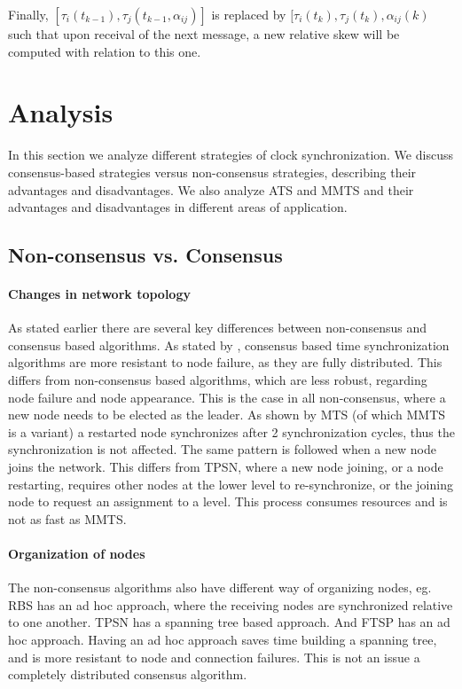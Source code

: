\documentclass[a4paper,12pt]{article}
\begin{document}
    Finally, $[\tau_i(t_{k-1}), \tau_j(t_{k-1},\alpha_{ij})]$ is replaced by $[\tau_i(t_k), \tau_j(t_k),\alpha_{ij}(k)$ such that upon receival of the next message, a new relative skew will be computed with relation to this one.
    
    
\clearpage

\section{Analysis}

In this section we analyze different strategies of clock synchronization. We discuss consensus-based strategies versus non-consensus strategies, describing their advantages and disadvantages. We also analyze ATS and MMTS and their advantages and disadvantages in different areas of application.

\subsection{Non-consensus vs. Consensus}

\paragraph{Changes in network topology} As stated earlier there are several key differences between non-consensus and consensus based algorithms. As stated by \cite{SchenatoGamba07}, consensus based time synchronization algorithms are more resistant to node failure, as they are fully distributed. This differs from non-consensus based algorithms, which are less robust, regarding node failure and node appearance. This is the case in all non-consensus, where a new node needs to be elected as the leader. As shown by \citet{HeLiChenCheng13} MTS (of which MMTS is a variant) a restarted node synchronizes after 2 synchronization cycles, thus the synchronization is not affected. The same pattern is followed when a new node joins the network. This differs from TPSN, where a new node joining, or a node restarting, requires other nodes at the lower level to re-synchronize, or the joining node to request an assignment to a level. This process consumes resources and is not as fast as MMTS. 

\paragraph{Organization of nodes} The non-consensus algorithms also have different way of organizing nodes, eg. RBS has an ad hoc approach, where the receiving nodes are synchronized relative to one another. TPSN has a spanning tree based approach. And FTSP has an ad hoc approach. Having an ad hoc approach saves time building a spanning tree, and is more resistant to node and connection failures. This is not an issue a completely distributed consensus algorithm.
\end{document}
